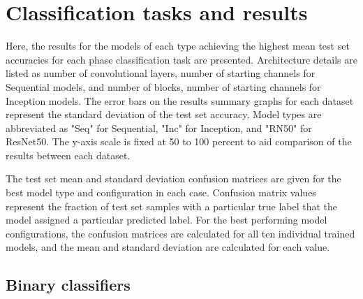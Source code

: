 \documentclass[12pt]{article}
\begin{document}
\section{Classification tasks and results}
Here, the results for the models of each type achieving the highest mean test set accuracies for each phase classification task are presented. Architecture details are listed as number of convolutional layers, number of starting channels for Sequential models, and number of blocks, number of starting channels for Inception models. The error bars on the results summary graphs for each dataset represent the standard deviation of the test set accuracy. Model types are abbreviated as "Seq" for Sequential, "Inc" for Inception, and "RN50" for ResNet50. The y-axis scale is fixed at 50 to 100 percent to aid comparison of the results between each dataset.

The test set mean and standard deviation confusion matrices are given for the best model type and configuration in each case. Confusion matrix values represent the fraction of test set samples with a particular true label that the model assigned a particular predicted label. For the best performing model configurations, the confusion matrices are calculated for all ten individual trained models, and the mean and standard deviation are calculated for each value.


\subsection{Binary classifiers}
\end{document}
